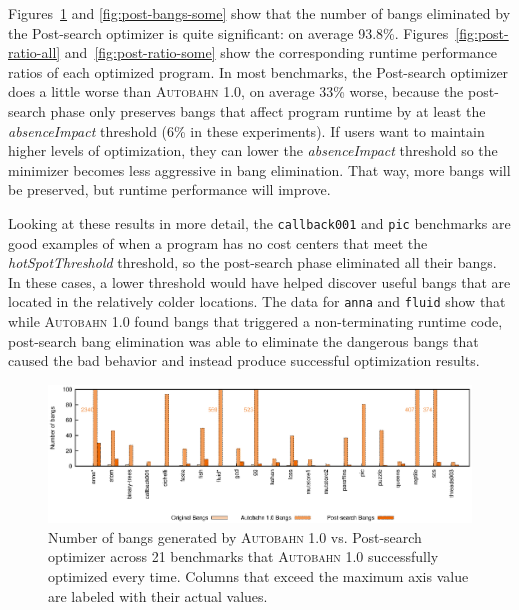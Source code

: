 \documentclass[format=sigplan, review=true, 9pt]{acmart}
\newcommand{\scaption}[1]{\caption{#1}}
\newcommand{\hotspotcost}[0]{\textit{hotSpotThreshold}}
\newcommand{\dangerous}[0]{dangerous}
\newcommand{\Ao}[0]{\textsc{Autobahn 1.0}}
\newcommand{\postopt}[0]{post-search}
\newcommand{\Postopt}[0]{Post-search}
\newcommand{\absim}[0]{\textit{absenceImpact}}
\newcommand{\nonterm}[0]{non-terminating}
\newcommand{\postBangs}[0]{93.8\%}
\newcommand{\postRatioWorse}[0]{33\%}
\begin{document}
Figures~\ref{fig:post-bangs-all} and \ref{fig:post-bangs-some} show
that the number of bangs eliminated by the \Postopt{} optimizer is quite
significant: on average \postBangs{}. Figures~\ref{fig:post-ratio-all}
and~\ref{fig:post-ratio-some} show the corresponding runtime
performance ratios of each optimized program. In most benchmarks,
the \Postopt{} optimizer does
a little worse than \Ao{}, on average \postRatioWorse{} worse, because 
the \postopt{} phase only preserves bangs that affect program
runtime by at least the \absim{} threshold (6\% in these experiments). 
If users want to
maintain higher levels of optimization,
they can lower the \absim{} threshold so the minimizer becomes less
aggressive in bang elimination. That way, more bangs will be
preserved, but runtime performance will
improve. 

Looking at these results in more detail, 
the \texttt{callback001} and \texttt{pic} benchmarks are good
examples of when a program has no cost centers that meet
the \hotspotcost{} threshold, so the \postopt{} phase eliminated all their bangs.
In these cases, a lower threshold would have
helped discover useful bangs that are located in the relatively colder locations.
The data for \texttt{anna} and \texttt{fluid}
show that while \Ao{} found bangs that triggered a \nonterm{} runtime
code, \postopt{} bang elimination was able to eliminate
the \dangerous{} bangs that caused the bad behavior and instead produce
successful optimization results.

\begin{figure}
\includegraphics[width=\textwidth]{aut-post-bangs}
\scaption{Number of bangs generated by \Ao{} vs. \Postopt{} optimizer 
across 21 benchmarks that \Ao{} successfully optimized
every time. Columns that exceed the maximum axis value are labeled
with their actual values. }
\label{fig:post-bangs-all}
\end{figure}
\end{document}
